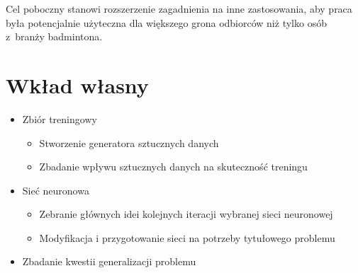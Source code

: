 Cel poboczny stanowi rozszerzenie zagadnienia na inne zastosowania, aby praca była potencjalnie użyteczna dla większego grona odbiorców niż tylko osób z~branży badmintona.
\\

\section{Wkład własny}

\begin{itemize}
	\item Zbiór treningowy
		\begin{itemize}
			\item Stworzenie generatora sztucznych danych 
			\item Zbadanie wpływu sztucznych danych na skuteczność treningu 
		\end{itemize}
	\item Sieć neuronowa
	\begin{itemize}
		\item Zebranie głównych idei kolejnych iteracji wybranej sieci neuronowej 
		\item Modyfikacja i przygotowanie sieci na potrzeby tytułowego problemu 
	\end{itemize}
	\item Zbadanie kwestii generalizacji problemu 
\end{itemize}
